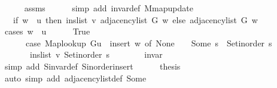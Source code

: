 \begin{isabellebody}
\ \ \ \ \isamarkupfalse%
\ assms\isanewline
\ \ \ \ \isamarkupfalse%
\ {\isacharparenleft}{\kern0pt}simp\ add{\isacharcolon}{\kern0pt}\ invar{\isacharunderscore}{\kern0pt}def\ M{\isachardot}{\kern0pt}map{\isacharunderscore}{\kern0pt}update{\isacharparenright}{\kern0pt}\isanewline
\ \ \isamarkupfalse%
\ \isamarkupfalse%
\ {\isachardoublequoteopen}{\isachardot}{\kern0pt}{\isachardot}{\kern0pt}{\isachardot}{\kern0pt}\ {\isacharequal}{\kern0pt}\ {\isacharparenleft}{\kern0pt}if\ w\ {\isacharequal}{\kern0pt}\ {\isacharquery}{\kern0pt}u\ then\ ins{\isacharunderscore}{\kern0pt}list\ {\isacharquery}{\kern0pt}v\ {\isacharparenleft}{\kern0pt}adjacency{\isacharunderscore}{\kern0pt}list\ G\ w{\isacharparenright}{\kern0pt}\ else\ adjacency{\isacharunderscore}{\kern0pt}list\ G\ w{\isacharparenright}{\kern0pt}{\isachardoublequoteclose}\isanewline
\ \ \isamarkupfalse%
\ {\isacharparenleft}{\kern0pt}cases\ {\isachardoublequoteopen}w\ {\isacharequal}{\kern0pt}\ {\isacharquery}{\kern0pt}u{\isachardoublequoteclose}{\isacharparenright}{\kern0pt}\isanewline
\ \ \ \ \isamarkupfalse%
\ True\isanewline
\ \ \ \ \isamarkupfalse%
\isanewline
\ \ \ \ \ \ {\isachardoublequoteopen}{\isacharparenleft}{\kern0pt}case\ {\isacharparenleft}{\kern0pt}Map{\isacharunderscore}{\kern0pt}lookup\ G{\isacharparenleft}{\kern0pt}{\isacharquery}{\kern0pt}u\ {\isasymmapsto}\ {\isacharquery}{\kern0pt}insert{\isacharparenright}{\kern0pt}{\isacharparenright}{\kern0pt}\ w\ of\ None\ {\isasymRightarrow}\ {\isacharbrackleft}{\kern0pt}{\isacharbrackright}{\kern0pt}\ {\isacharbar}{\kern0pt}\ Some\ s\ {\isasymRightarrow}\ Set{\isacharunderscore}{\kern0pt}inorder\ s{\isacharparenright}{\kern0pt}\ {\isacharequal}{\kern0pt}\isanewline
\ \ \ \ \ \ \ ins{\isacharunderscore}{\kern0pt}list\ {\isacharquery}{\kern0pt}v\ {\isacharparenleft}{\kern0pt}Set{\isacharunderscore}{\kern0pt}inorder\ s{\isacharparenright}{\kern0pt}{\isachardoublequoteclose}\isanewline
\ \ \ \ \ \ \isamarkupfalse%
\ invar\isanewline
\ \ \ \ \ \ \isamarkupfalse%
\ {\isacharparenleft}{\kern0pt}simp\ add{\isacharcolon}{\kern0pt}\ S{\isachardot}{\kern0pt}invar{\isacharunderscore}{\kern0pt}def\ S{\isachardot}{\kern0pt}inorder{\isacharunderscore}{\kern0pt}insert{\isacharparenright}{\kern0pt}\isanewline
\ \ \ \ \isamarkupfalse%
\ {\isacharquery}{\kern0pt}thesis\isanewline
\ \ \ \ \ \ \isamarkupfalse%
\ {\isacharparenleft}{\kern0pt}auto\ simp\ add{\isacharcolon}{\kern0pt}\ adjacency{\isacharunderscore}{\kern0pt}list{\isacharunderscore}{\kern0pt}def\ Some{\isacharparenright}{\kern0pt}\isanewline

\end{isabellebody}
